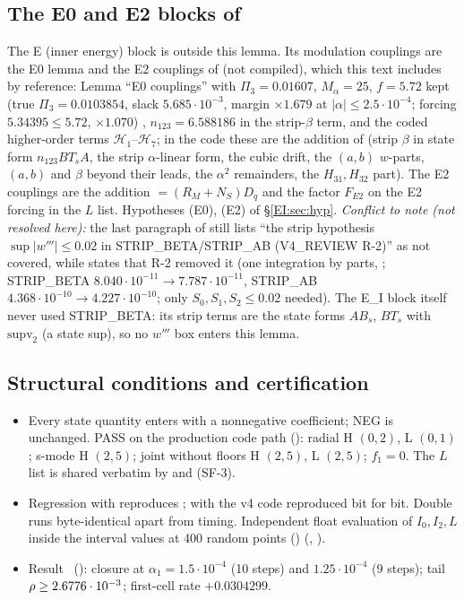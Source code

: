 \documentclass[11pt]{article}
\begin{document}
\subsection{The E0 and E2 blocks of }\label{EI:sec:E0E2}
The E (inner energy) block is outside this lemma. Its modulation couplings are the E0 lemma and the E2 couplings of  (not compiled), which this text includes by reference: Lemma ``E0 couplings'' with $\Pi_3=0.01607$, $M_\alpha=25$, $f=5.72$ kept (true $\Pi_3=0.0103854$, slack $5.685\cdot10^{-3}$, margin $\times1.679$ at $|\alpha|\le2.5\cdot10^{-4}$; forcing $5.34395\le5.72$, $\times1.070$) \tC, $n_{123}=6.588186$ in the strip-$\beta$ term, and the coded higher-order terms $\mathcal H_1$--$\mathcal H_7$; in the code these are the addition  of  (strip $\beta$ in state form $n_{123}BT_sA$, the strip $\alpha$-linear form, the cubic drift, the $(a,b)$ $w$-parts, $(a,b)$ and $\beta$ beyond their leads, the $\alpha^2$ remainders, the $H_{31},H_{32}$ part). The E2 couplings are the addition  $=(R_M+N_S)D_q$ and the factor $F_{E2}$ on the E2 forcing in the $L$ list. Hypotheses (E0), (E2) of \S\ref{EI:sec:hyp}.
\emph{Conflict to note (not resolved here):} the last paragraph of  still lists ``the strip hypothesis $\sup|w'''|\le0.02$ in STRIP\_BETA/STRIP\_AB (V4\_REVIEW R-2)'' as not covered, while  states that R-2 removed it (one integration by parts, ; STRIP\_BETA $8.040\cdot10^{-11}\to7.787\cdot10^{-11}$, STRIP\_AB $4.368\cdot10^{-10}\to4.227\cdot10^{-10}$; only $S_0,S_1,S_2\le0.02$ needed). The E\_I block itself never used STRIP\_BETA: its strip terms are the state forms $AB_s$, $BT_s$ with $\mathrm{supv}_2$ (a state sup), so no $w'''$ box enters this lemma.

\subsection{Structural conditions and certification}\label{EI:sec:cert}
\begin{itemize}[leftmargin=*]
\item Every state quantity enters with a nonnegative coefficient; NEG is unchanged.  PASS on the production code path (): radial H $(0,2)$, L $(0,1)$; s-mode H $(2,5)$; joint without floors H $(2,5)$, L $(2,5)$; $f_1=0$. The $L$ list is shared verbatim by  and  (SF-3).
\item Regression with  reproduces ; with  the v4 code reproduced  bit for bit. Double runs byte-identical apart from timing. Independent float evaluation of $I_0,I_2,L$ inside the interval values at 400 random points () (, ).
\item Result \tC\ (): closure at $\alpha_1=1.5\cdot10^{-4}$ (10 steps) and $1.25\cdot10^{-4}$ (9 steps); tail $\rho\ge2.6776\cdot10^{-3}$; first-cell rate $+0.0304299$.
\end{itemize}
\end{document}
